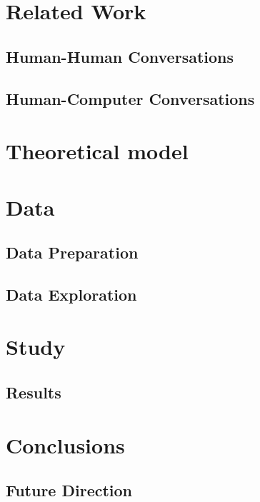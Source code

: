 \documentclass[copyright,masters]{cslu-thesis}
\begin{document}
\chapter{Related Work}

\section{Human-Human Conversations}

\section{Human-Computer Conversations}

\chapter{Theoretical model}

\chapter{Data}

\section{Data Preparation}

\section{Data Exploration}


\chapter {Study}

\section{Results}

\chapter{Conclusions}

\section{Future Direction}



\appendix


\nocite{*} %


\end{document}
